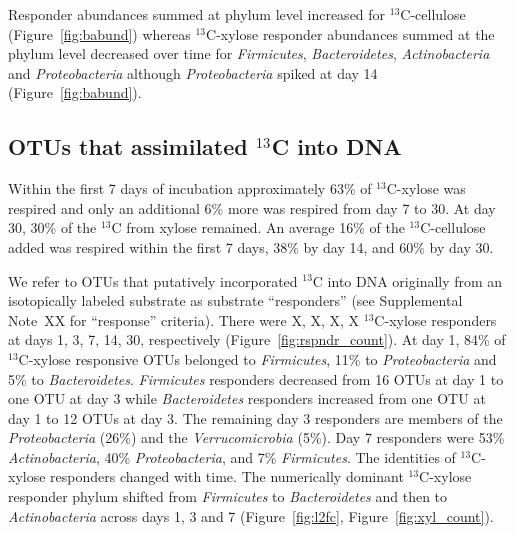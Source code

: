 Responder abundances summed at phylum level increased for
$^{13}$C-cellulose (Figure~\ref{fig:babund}) whereas $^{13}$C-xylose
responder abundances summed at the phylum level decreased over time for
\textit{Firmicutes}, \textit{Bacteroidetes}, \textit{Actinobacteria} and
\textit{Proteobacteria} although \textit{Proteobacteria} spiked at day 14
(Figure~\ref{fig:babund}).

\subsection{OTUs that assimilated $^{13}$C into DNA} \label{responders}
Within the first 7 days of incubation approximately 63\% of $^{13}$C-xylose was
respired and only an additional 6\% more was respired from day 7 to 30. At day
30, 30\% of the $^{13}$C from xylose remained. An average 16\% of the
$^{13}$C-cellulose added was respired within the first 7 days, 38\% by day 14,
and 60\% by day 30.   

We refer to OTUs that putatively incorporated $^{13}$C into DNA originally from
an isotopically labeled substrate as  substrate ``responders'' (see
Supplemental Note~XX for ``response'' criteria). There were X, X, X,
X $^{13}$C-xylose responders at days 1, 3, 7, 14, 30, respectively
(Figure~\ref{fig:rspndr_count}). At day 1, 84\% of $^{13}$C-xylose responsive
OTUs belonged to \textit{Firmicutes}, 11\% to \textit{Proteobacteria} and 5\%
to \textit{Bacteroidetes}. \textit{Firmicutes} responders decreased from 16
OTUs at day 1 to one OTU at day 3 while \textit{Bacteroidetes} responders
increased from one OTU at day
1 to 12 OTUs at day 3. The remaining day 3 responders are members of the
\textit{Proteobacteria} (26\%) and the \textit{Verrucomicrobia} (5\%). Day
7 responders were 53\% \textit{Actinobacteria}, 40\% \textit{Proteobacteria},
and 7\% \textit{Firmicutes}. The identities of $^{13}$C-xylose responders
changed with time. The numerically dominant $^{13}$C-xylose responder phylum
shifted from \textit{Firmicutes} to \textit{Bacteroidetes} and then to
\textit{Actinobacteria} across days 1, 3 and 7 (Figure~\ref{fig:l2fc},
Figure~\ref{fig:xyl_count}). 

